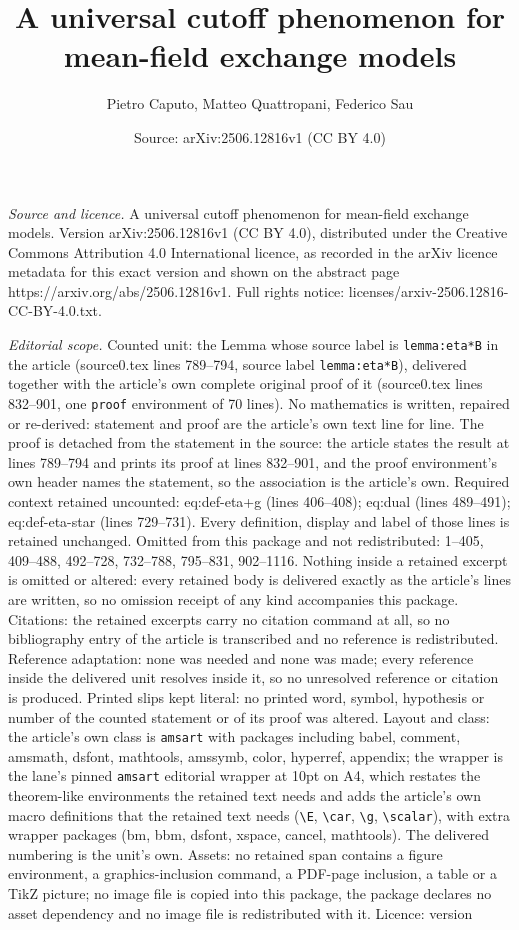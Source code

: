 \documentclass[10pt,a4paper]{amsart}
\title[A universal cutoff phenomenon for mean-field exchange models]{A universal cutoff phenomenon for mean-field exchange models}
\author{Pietro Caputo, Matteo Quattropani, Federico Sau}
\date{Source: arXiv:2506.12816v1 (CC BY 4.0)}
\begin{document}
\maketitle

\noindent\emph{Source and licence.} A universal cutoff phenomenon for mean-field exchange models. Version arXiv:2506.12816v1 (CC BY 4.0), distributed under the Creative Commons Attribution 4.0 International licence, as recorded in the arXiv licence metadata for this exact version and shown on the abstract page https://arxiv.org/abs/2506.12816v1. Full rights notice: licenses/arxiv-2506.12816-CC-BY-4.0.txt.\par\smallskip

\noindent\textit{Editorial scope.} Counted unit: the Lemma whose source label is \texttt{lemma:eta*B} in the article (source0.tex lines 789--794, source label \texttt{lemma:eta*B}), delivered together with the article's own complete original proof of it (source0.tex lines 832--901, one \texttt{proof} environment of 70 lines). No mathematics is written, repaired or re-derived: statement and proof are the article's own text line for line. The proof is detached from the statement in the source: the article states the result at lines 789--794 and prints its proof at lines 832--901, and the proof environment's own header names the statement, so the association is the article's own. Required context retained uncounted: eq:def-eta+g (lines 406--408); eq:dual (lines 489--491); eq:def-eta-star (lines 729--731). Every definition, display and label of those lines is retained unchanged. Omitted from this package and not redistributed: 1--405, 409--488, 492--728, 732--788, 795--831, 902--1116. Nothing inside a retained excerpt is omitted or altered: every retained body is delivered exactly as the article's lines are written, so no omission receipt of any kind accompanies this package. Citations: the retained excerpts carry no citation command at all, so no bibliography entry of the article is transcribed and no reference is redistributed. Reference adaptation: none was needed and none was made; every reference inside the delivered unit resolves inside it, so no unresolved reference or citation is produced. Printed slips kept literal: no printed word, symbol, hypothesis or number of the counted statement or of its proof was altered. Layout and class: the article's own class is \texttt{amsart} with packages including babel, comment, amsmath, dsfont, mathtools, amssymb, color, hyperref, appendix; the wrapper is the lane's pinned \texttt{amsart} editorial wrapper at 10pt on A4, which restates the theorem-like environments the retained text needs and adds the article's own macro definitions that the retained text needs (\texttt{\textbackslash E}, \texttt{\textbackslash car}, \texttt{\textbackslash g}, \texttt{\textbackslash scalar}), with extra wrapper packages (bm, bbm, dsfont, xspace, cancel, mathtools). The delivered numbering is the unit's own. Assets: no retained span contains a figure environment, a graphics-inclusion command, a PDF-page inclusion, a table or a TikZ picture; no image file is copied into this package, the package declares no asset dependency and no image file is redistributed with it. Licence: version 
\end{document}
